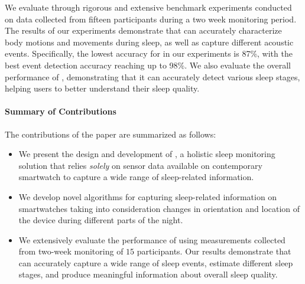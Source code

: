   
We evaluate \systemname through rigorous and extensive benchmark experiments conducted on data collected from fifteen participants during a two week monitoring period. The results of our experiments demonstrate that \systemname can accurately characterize body motions and movements during sleep, as well as capture different acoustic events. Specifically, the lowest accuracy for \systemname in our experiments is 87\%, with the best event detection accuracy reaching up to 98\%. We also evaluate the overall performance of \systemname, demonstrating that it can accurately detect various sleep stages, helping users to better understand their sleep quality.

\paragraph{Summary of Contributions}

The contributions of the paper are summarized as follows:
\begin{itemize}[noitemsep]
	\item We present the design and development of \systemname, a holistic sleep monitoring solution that relies {\em solely} on sensor data available on contemporary smartwatch to capture a wide range of sleep-related information.
	\item We develop novel algorithms for capturing sleep-related information on smartwatches taking into consideration changes in orientation and location of the device during different parts of the night.
	\item We extensively evaluate the performance of \systemname using measurements collected from two-week monitoring of $15$ participants. Our results demonstrate that \systemname can accurately capture a wide range of sleep events, estimate different sleep stages, and produce meaningful information about overall sleep quality.
\end{itemize}

